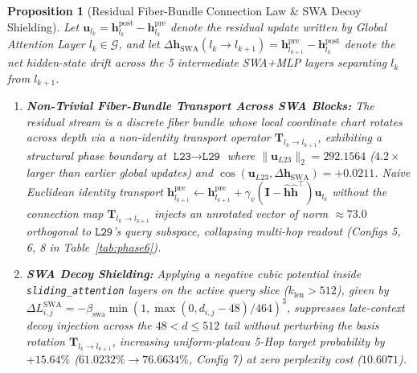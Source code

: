 \documentclass[11pt,letterpaper]{article}
\newtheorem{proposition}[theorem]{Proposition}
\theoremstyle{definition}
\begin{document}
\begin{proposition}[Residual Fiber-Bundle Connection Law \& SWA Decoy Shielding]
\label{prop:fiber_bundle}
Let $\mathbf{u}_{l_k} = \mathbf{h}^{\text{post}}_{l_k} - \mathbf{h}^{\text{pre}}_{l_k}$ denote the residual update written by Global Attention Layer $l_k \in \mathcal{G}$, and let $\Delta\mathbf{h}_{\text{SWA}}(l_k \to l_{k+1}) = \mathbf{h}^{\text{pre}}_{l_{k+1}} - \mathbf{h}^{\text{post}}_{l_k}$ denote the net hidden-state drift across the 5 intermediate SWA+MLP layers separating $l_k$ from $l_{k+1}$.
\begin{enumerate}
    \item \textbf{Non-Trivial Fiber-Bundle Transport Across SWA Blocks:} The residual stream is a discrete fiber bundle whose local coordinate chart rotates across depth via a non-identity transport operator $\mathbf{T}_{l_k \to l_{k+1}}$, exhibiting a structural phase boundary at $\texttt{L23} \to \texttt{L29}$ where $\|\mathbf{u}_{L23}\|_2 = 292.1564$ ($4.2\times$ larger than earlier global updates) and $\cos(\mathbf{u}_{L23}, \Delta\mathbf{h}_{\text{SWA}}) = +0.0211$. Naive Euclidean identity transport $\mathbf{h}^{\text{pre}}_{l_{k+1}} \gets \mathbf{h}^{\text{pre}}_{l_{k+1}} + \gamma_v (\mathbf{I} - \hat{\mathbf{h}}\hat{\mathbf{h}}^\top)\mathbf{u}_{l_k}$ without the connection map $\mathbf{T}_{l_k \to l_{k+1}}$ injects an unrotated vector of norm $\approx 73.0$ orthogonal to $\texttt{L29}$'s query subspace, collapsing multi-hop readout (Configs 5, 6, 8 in Table~\ref{tab:phase6}).
    \item \textbf{SWA Decoy Shielding:} Applying a negative cubic potential inside \texttt{sliding\_attention} layers on the active query slice ($k_{\text{len}} > 512$), given by $\Delta L^{\text{SWA}}_{i,j} = -\beta_{\text{swa}} \min(1, \max(0, d_{i,j} - 48) / 464)^3$, suppresses late-context decoy injection across the $48 < d \le 512$ tail without perturbing the basis rotation $\mathbf{T}_{l_k \to l_{k+1}}$, increasing uniform-plateau 5-Hop target probability by $+15.64\%$ ($61.0232\% \to 76.6634\%$, Config 7) at zero perplexity cost ($10.6071$).
\end{enumerate}
\end{proposition}
\end{document}
